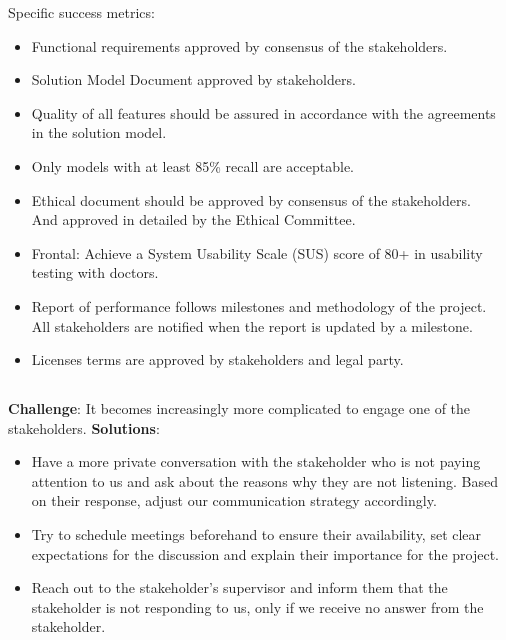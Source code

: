 Specific success metrics:

\begin{itemize}
    \item Functional requirements approved by consensus of the stakeholders.
    \item Solution Model Document approved by stakeholders.
    \item Quality of all features should be assured in accordance with the agreements in the solution model.
    \item Only models with at least 85\% recall are acceptable.
    \item Ethical document should be approved by consensus of the stakeholders. \\
    And approved in detailed by the Ethical Committee.
    \item Frontal: Achieve a System Usability Scale (SUS) score of 80+ in usability testing with doctors.
    \item Report of performance follows milestones and methodology of the project. \\
    All stakeholders are notified when the report is updated by a milestone.
    \item Licenses terms are approved by stakeholders and legal party.
\end{itemize}

\subsection*{}
\begin{warning}
    \textbf{Challenge}: It becomes increasingly more complicated to engage one of the stakeholders.
    \textbf{Solutions}:
    \begin{itemize}
        \item Have a more private conversation with the stakeholder who is not paying attention to us and ask about the reasons why they are not listening. Based on their response, adjust our communication strategy accordingly.
        \item Try to schedule meetings beforehand to ensure their availability, set clear expectations for the discussion and explain their importance for the project.
        \item Reach out to the stakeholder's supervisor and inform them that the stakeholder is not responding to us, only if we receive no answer from the stakeholder.
    \end{itemize}
\end{warning}


